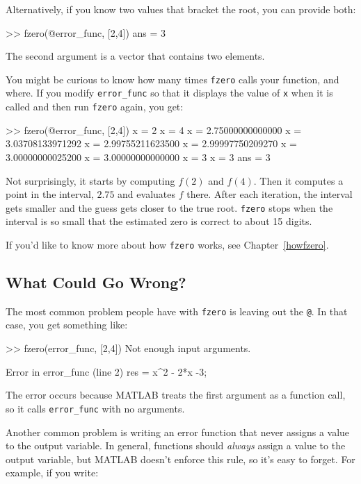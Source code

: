 Alternatively, if you know two values that bracket the root,
you can provide both:

\begin{code}
>> fzero(@error_func, [2,4])
ans = 3
\end{code}

The second argument is a vector that contains two elements.  


You might be curious to know how many times {\tt fzero} calls your
function, and where.  If you modify \verb"error_func" so that it displays
the value of {\tt x} when it is called and then run {\tt fzero}
again, you get:

\begin{code}
>> fzero(@error_func, [2,4])
x = 2
x = 4
x = 2.75000000000000
x = 3.03708133971292
x = 2.99755211623500
x = 2.99997750209270
x = 3.00000000025200
x = 3.00000000000000
x = 3
x = 3
ans = 3
\end{code}

Not surprisingly, it starts by computing $f(2)$ and $f(4)$.  Then it computes a point in the interval, $2.75$ and evaluates $f$ there.  After each iteration, the interval gets smaller and the guess gets closer to the true root.
{\tt fzero} stops when the interval is so small that the estimated
zero is correct to about 15 digits.
 
If you'd like to know more about how {\tt fzero} works, see Chapter~\ref{howfzero}.


\subsection{What Could Go Wrong?}

The most common problem people have with {\tt fzero} is leaving
out the {\tt @}.  In that case, you get something like:

\begin{code}
>> fzero(error_func, [2,4])
Not enough input arguments.

Error in error_func (line 2)
    res = x^2 - 2*x -3;
\end{code}

The error occurs because MATLAB treats the first argument as a function call, so it calls \verb"error_func" with no arguments.


Another common problem is writing an error function that never
assigns a value to the output variable.  In general, functions should
{\em always} assign a value to the output variable, but MATLAB doesn't
enforce this rule, so it's easy to forget.  For example, if you
write:

